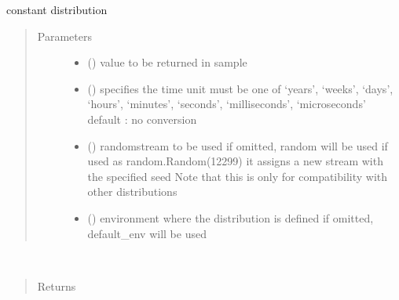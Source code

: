 \documentclass[letterpaper,10pt,english]{sphinxmanual}
\begin{document}
\begin{fulllineitems}
\label{\detokenize{Reference:salabim.Constant}}
constant distribution
\begin{quote}\begin{description}
\item[{Parameters}] \leavevmode\begin{itemize}
\item {} 
 () \textendash{} value to be returned in sample

\item {} 
 () \textendash{} specifies the time unit 
must be one of ‘years’, ‘weeks’, ‘days’, ‘hours’, ‘minutes’, ‘seconds’, ‘milliseconds’, ‘microseconds’ 
default : no conversion 

\item {} 
 () \textendash{} randomstream to be used 
if omitted, random will be used 
if used as random.Random(12299)
it assigns a new stream with the specified seed 
Note that this is only for compatibility with other distributions

\item {} 
 ({\hyperref[\detokenize{Reference:salabim.Environment}]{}}) \textendash{} environment where the distribution is defined 
if omitted, default\_env will be used

\end{itemize}

\end{description}\end{quote}

\begin{fulllineitems}
\label{\detokenize{Reference:salabim.Constant.mean}}~\begin{quote}\begin{description}
\item[{Returns}] \leavevmode
{}


\end{description}
\end{quote}
\end{fulllineitems}
\end{fulllineitems}
\end{document}
